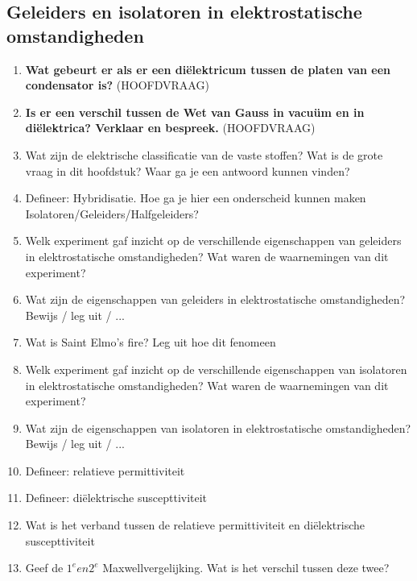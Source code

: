 \documentclass[12pt]{article}
\begin{document}
    \subsection{Geleiders en isolatoren in elektrostatische omstandigheden}
    \begin{enumerate}
        \item \textbf{Wat gebeurt er als er een diëlektricum tussen de platen van een condensator is?} (HOOFDVRAAG)
        \item \textbf{Is er een verschil tussen de Wet van Gauss in vacuüm en in diëlektrica? Verklaar en bespreek.} (HOOFDVRAAG)
        \item Wat zijn de elektrische classificatie van de vaste stoffen? Wat is de grote vraag in dit hoofdstuk? Waar ga je een antwoord kunnen vinden?
        \item Defineer: Hybridisatie. Hoe ga je hier een onderscheid kunnen maken Isolatoren/Geleiders/Halfgeleiders?
        \item Welk experiment gaf inzicht op de verschillende eigenschappen van geleiders in elektrostatische omstandigheden? Wat waren de waarnemingen van dit experiment?
        \item Wat zijn de eigenschappen van geleiders in elektrostatische omstandigheden? Bewijs / leg uit / ...
        \item Wat is Saint Elmo's fire? Leg uit hoe dit fenomeen 
        \item Welk experiment gaf inzicht op de verschillende eigenschappen van isolatoren in elektrostatische omstandigheden? Wat waren de waarnemingen van dit experiment?
        \item Wat zijn de eigenschappen van isolatoren in elektrostatische omstandigheden? Bewijs / leg uit / ...
        \item Defineer: relatieve permittiviteit
        \item Defineer: diëlektrische suscepttiviteit
        \item Wat is het verband tussen de relatieve permittiviteit en diëlektrische suscepttiviteit
        \item Geef de $1^e en 2^e$ Maxwellvergelijking. Wat is het verschil tussen deze twee?
    \end{enumerate}
\end{document}

